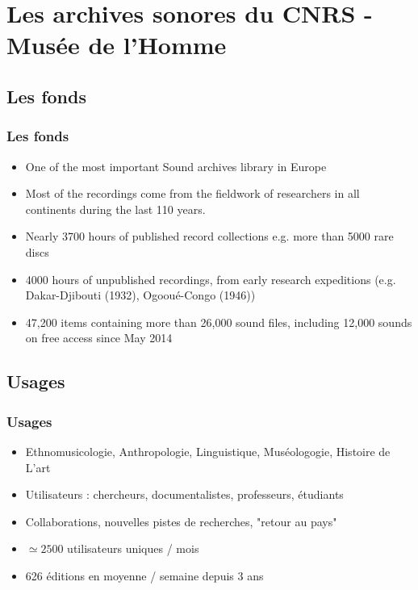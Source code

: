 \documentclass[final, hyperref, table]{beamer}
\begin{document}
\section[CNRS-MH]{Les archives sonores du CNRS - Musée de l'Homme}\label{sec:archives-CREM}
    
    \subsection{Les fonds}
   \begin{frame}\frametitle{Les fonds}
     \begin{block}{}
       \begin{itemize}
       \item One of the most important Sound archives library in Europe
       \item Most of the recordings come from the fieldwork of
      researchers in \alert{all continents} during the last \alert{110 years}.

    \item Nearly \alert{3700 hours of published record collections} e.g. more than 5000 rare discs
    \item \alert{4000 hours of unpublished recordings}, from early
      research expeditions (e.g. Dakar-Djibouti (1932), Ogooué-Congo
      (1946))
    \item \alert{47,200 items} containing more than
      \alert{26,000 sound files}, including 12,000 sounds on free
      access since May 2014
          
       \end{itemize}
     \end{block}
    \end{frame}
    
    \subsection{Usages}
     \begin{frame}\frametitle{Usages}
      \begin{block}{}
       \begin{itemize}
    \item Ethnomusicologie, Anthropologie, Linguistique, Muséologogie, Histoire de L'art
    \item Utilisateurs : chercheurs, documentalistes, professeurs, étudiants
    \item Collaborations, nouvelles pistes de recherches, "retour au pays"
    \item $\simeq2500$ utilisateurs uniques / mois
    \item 626 éditions en moyenne / semaine depuis 3 ans
       \end{itemize}
     \end{block}
     \end{frame}
     
\end{document}
